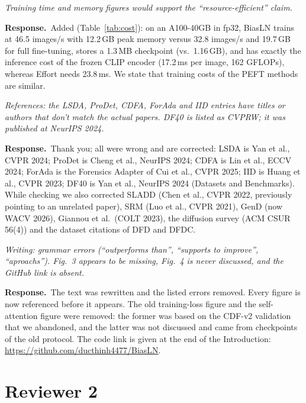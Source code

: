 \documentclass[11pt]{article}
\newenvironment{comment}{\par\medskip\noindent\begin{minipage}{\linewidth}\color{black!70}\itshape}{\end{minipage}\par\smallskip}
\newcommand{\resp}{\noindent\textbf{Response.}~}
\begin{document}
\begin{comment}
Training time and memory figures would support the ``resource-efficient'' claim.
\end{comment}
\resp Added (Table~\ref{tab:cost}): on an A100-40GB in fp32, BiasLN trains at 46.5 images/s with 12.2\,GB peak memory versus 32.8 images/s and 19.7\,GB for full fine-tuning, stores a 1.3\,MB checkpoint (vs.\ 1.16\,GB), and has exactly the inference cost of the frozen CLIP encoder (17.2\,ms per image, 162 GFLOPs), whereas Effort needs 23.8\,ms. We state that training costs of the PEFT methods are similar.

\begin{comment}
References: the LSDA, ProDet, CDFA, ForAda and IID entries have titles or authors that don't match the actual papers. DF40 is listed as CVPRW; it was published at NeurIPS 2024.
\end{comment}
\resp Thank you; all were wrong and are corrected: LSDA is Yan et al., CVPR 2024; ProDet is Cheng et al., NeurIPS 2024; CDFA is Lin et al., ECCV 2024; ForAda is the Forensics Adapter of Cui et al., CVPR 2025; IID is Huang et al., CVPR 2023; DF40 is Yan et al., NeurIPS 2024 (Datasets and Benchmarks). While checking we also corrected SLADD (Chen et al., CVPR 2022, previously pointing to an unrelated paper), SRM (Luo et al., CVPR 2021), GenD (now WACV 2026), Giannou et al.\ (COLT 2023), the diffusion survey (ACM CSUR 56(4)) and the dataset citations of DFD and DFDC.

\begin{comment}
Writing: grammar errors (``outperforms than'', ``supports to improve'', ``aproachs''). Fig.~3 appears to be missing, Fig.~4 is never discussed, and the GitHub link is absent.
\end{comment}
\resp The text was rewritten and the listed errors removed. Every figure is now referenced before it appears. The old training-loss figure and the self-attention figure were removed: the former was based on the CDF-v2 validation that we abandoned, and the latter was not discussed and came from checkpoints of the old protocol. The code link is given at the end of the Introduction: \url{https://github.com/ducthinh4477/BiasLN}.

\section*{Reviewer 2}
\end{document}
